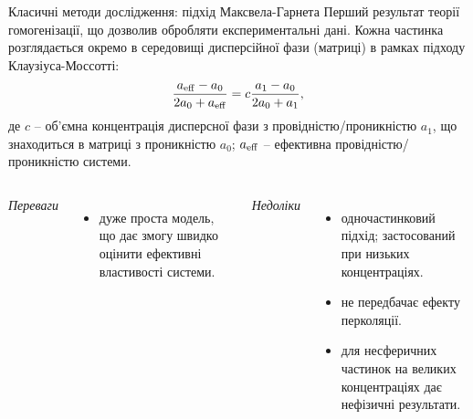 \documentclass[10pt]{beamer}
\begin{document}
\begin{frame}{Класичні методи дослідження: підхід Максвела-Гарнета}
\footnotesize
    Перший результат теорії гомогенізації, що дозволив обробляти експериментальні дані.
    Кожна частинка розглядається окремо в середовищі дисперсійної фази (матриці) в рамках підходу Клаузіуса-Моссотті:
    \begin{equation}\label{eq:MG}
    \frac{a_{\rm eff} - a_0}{2a_0 + a_{\rm eff}} = c \frac{a_1 - a_0}{2a_0 + a_1},
    \end{equation}
    де $c$ -- об'ємна концентрація дисперсної фази з провідністю/проникністю $a_1$, що знаходиться в матриці з проникністю $a_0$; $a_{\rm eff}$ -- ефективна провідністю/проникністю системи.\par
    [J.C. Maxwell, A Treatise on Electricity and Magnetism, Clarendon Press (1873); J.C. Maxwell-Garnett, Trans. R. Soc. Lond. {\bf 203} (1904) 385]
    \vspace{-5pt}
    \begin{columns}[T,onlytextwidth]
          \begin{center}
          {\it Переваги}
          \end{center}
          \vspace{-10pt}
          \begin{itemize}
              \item дуже проста модель, що дає змогу швидко оцінити ефективні властивості системи.
          \end{itemize}
    
          \begin{center}
          {\it Недоліки}
          \end{center}
          \vspace{-10pt}
          \begin{itemize}
              \item одночастинковий підхід; застосований при низьких концентраціях.
              \item не передбачає ефекту перколяції.
              \item для несферичних частинок на великих концентраціях дає нефізичні результати.
          \end{itemize}
    \end{columns}
\end{frame}
\end{document}
